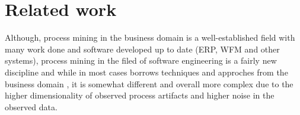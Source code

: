 \chapter{Related work}
Although, process mining in the business domain is a well-established field with many work done and software developed up to date (ERP, WFM and other systems), process mining in the filed of software engineering is a fairly new discipline and while in most cases borrows techniques and approches from the business domain \cite{citeulike:1885717}, it is somewhat different and overall more complex due to the higher dimensionality of observed process artifacts and higher noise in the observed data. 
